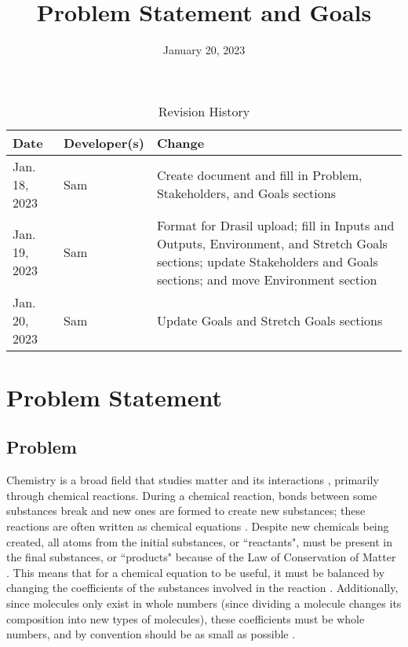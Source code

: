 \documentclass{article}
\title{Problem Statement and Goals\\\progname}
\author{\authname}
\date{January 20, 2023}
\begin{document}
\maketitle

\begin{table}[hp]
\caption{Revision History} \label{TblRevisionHistory}
\begin{tabularx}{\textwidth}{llX}
\toprule
\textbf{Date} & \textbf{Developer(s)} & \textbf{Change}\\
\midrule
Jan. 18, 2023 & Sam & Create document and fill in Problem, Stakeholders, and
Goals sections\\
Jan. 19, 2023 & Sam & Format for Drasil upload; fill in Inputs and Outputs,
Environment, and Stretch Goals sections; update Stakeholders and Goals
sections; and move Environment section\\
Jan. 20, 2023 & Sam & Update Goals and Stretch Goals sections\\
\bottomrule
\end{tabularx}
\end{table}

\section{Problem Statement}


\subsection{Problem}

Chemistry is a broad field that studies matter and its interactions
\cite{gordon_chm101_2023}, primarily through chemical reactions.
During a chemical reaction, bonds between some substances break and new ones are
formed to create new substances; these reactions are often written as chemical
equations \cite{lund_introduction_2023}. Despite new chemicals being created,
all atoms from the initial substances, or ``reactants", must be present in the
final substances, or ``products" because of the Law of Conservation of Matter
\cite{lund_introduction_2023}. This means that for a chemical equation to be
useful, it must be balanced by changing the coefficients of the substances
involved in the reaction \cite{lund_introduction_2023}. Additionally, since
molecules only exist in whole numbers (since dividing a molecule changes its
composition into new types of molecules), these coefficients must be whole
numbers, and by convention should be as small as possible
\cite{lund_introduction_2023}.
\end{document}
